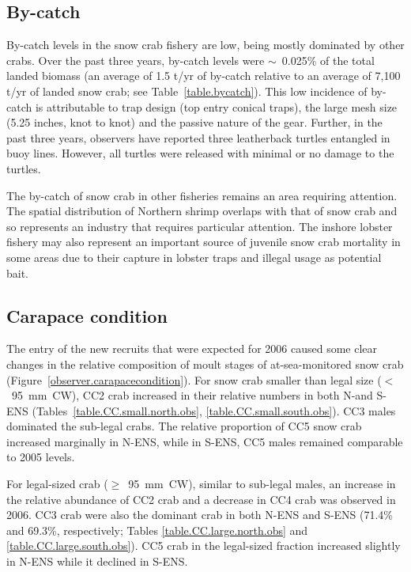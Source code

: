 \documentclass[11pt]{article}
\newcommand{\lt}{$<$}
\begin{document}
\subsection{By-catch}

By-catch levels in the snow crab fishery are low, being mostly dominated by other crabs. Over the past three years, by-catch levels were $\sim$~0.025\% of the total landed biomass (an average of 1.5 t/yr of by-catch relative to an average of 7,100 t/yr of landed snow crab; see Table~\ref{table.bycatch}). This low incidence of by-catch is attributable to trap design (top entry conical traps), the large mesh size (5.25 inches, knot to knot) and the passive nature of the gear. Further, in the past three years, observers have reported three leatherback turtles entangled in buoy lines. However, all turtles were released with minimal or no damage to the turtles. 

The by-catch of snow crab in other fisheries remains an area requiring attention. The spatial distribution of Northern shrimp overlaps with that of snow crab and so represents an industry that requires particular attention. The inshore lobster fishery may also represent an important source of juvenile snow crab mortality in some areas due to their capture in lobster traps and illegal usage as potential bait.

\subsection{Carapace condition} 

The entry of the new recruits that were expected for 2006 caused some clear changes in the relative composition of moult stages of at-sea-monitored snow crab (Figure~\ref{observer.carapacecondition}). For snow crab smaller than legal size (\lt~95~mm~CW), CC2 crab increased in their relative numbers in both N-and S-ENS (Tables~\ref{table.CC.small.north.obs}, \ref{table.CC.small.south.obs}). CC3 males dominated the sub-legal crabs. The relative proportion of CC5 snow crab increased marginally in N-ENS, while in S-ENS, CC5 males remained comparable to 2005 levels. 

For legal-sized crab ($\geq$~95~mm~CW), similar to sub-legal males, an increase in the relative abundance of CC2 crab and a decrease in CC4 crab was observed in 2006. CC3 crab were also the dominant crab in both N-ENS and S-ENS (71.4\% and 69.3\%, respectively; Tables \ref{table.CC.large.north.obs} and \ref{table.CC.large.south.obs}). CC5 crab in the legal-sized fraction increased slightly in N-ENS while it declined in S-ENS. 
\end{document}
